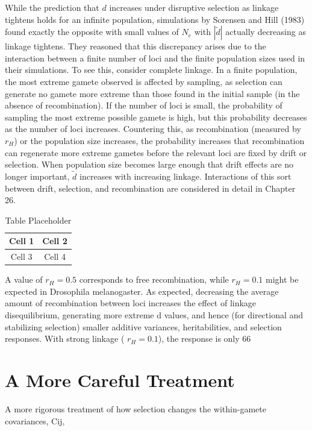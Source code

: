 \documentclass{article}
\begin{document}
While the prediction that $d$ increases under disruptive selection as linkage tightens holds for an infinite population, simulations by Sorensen and Hill (1983) found exactly the opposite with small values of $N_e$ with $|\widetilde{d}|$ actually decreasing as linkage tightens. They reasoned that this discrepancy arises due to the interaction between a finite number of loci and the finite population sizes used in their simulations. To see this, consider complete linkage. In a finite population, the most extreme gamete observed is affected by sampling, as selection can generate no gamete more extreme than those found in the initial sample (in the absence of recombination). If the number of loci is small, the probability of sampling the most extreme possible gamete is high, but this probability decreases as the number of loci increases. Countering this, as recombination (measured by $r_H$) or the population size increases, the probability increases that recombination can regenerate more extreme gametes before the relevant loci are fixed by drift or selection. When population size becomes large enough that drift effects are no longer important, $\widetilde{d}$ increases with increasing linkage. Interactions of this sort between drift, selection, and recombination are considered in detail in Chapter 26.

\begin{table}[h]
\centering
\begin{tabular}{|c|c|}
\hline
Cell 1 & Cell 2 \\
\hline
Cell 3 & Cell 4 \\
\hline
\end{tabular}
\caption{Table Placeholder}
\end{table}

A value of  $ r_{H} = 0.5 $ corresponds to free recombination, while  $ r_{H} = 0.1 $ might be expected in Drosophila melanogaster. As expected, decreasing the average amount of recombination between loci increases the effect of linkage disequilibrium, generating more extreme d values, and hence (for directional and stabilizing selection) smaller additive variances, heritabilities, and selection responses. With strong linkage ( $ r_{H} = 0.1 $), the response is only 66%

\section{A More Careful Treatment}
A more rigorous treatment of how selection changes the within-gamete covariances, Cij,
\end{document}
